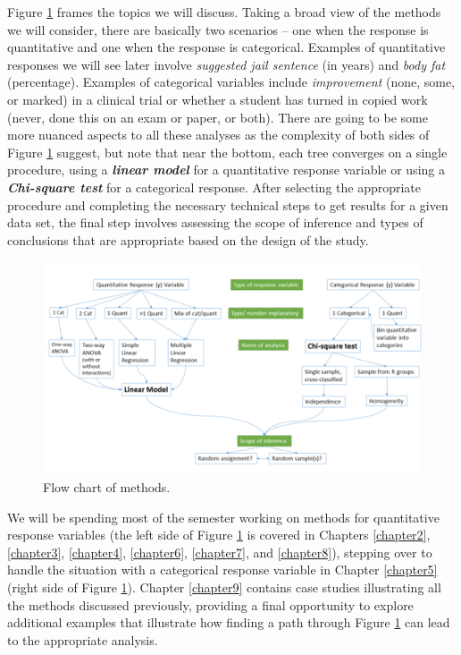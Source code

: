 \documentclass[]{book}
\renewcommand{\indent}{\hspace{15pt}}
\begin{document}
\indent Figure \ref{fig:Figure1-1} frames the topics we will discuss. Taking a broad
view of the methods we will consider,
there are basically two scenarios -- one when the response is quantitative and
one when the response is categorical. Examples of quantitative responses we will
see later involve \emph{suggested jail sentence} (in years) and \emph{body fat} (percentage).
Examples of categorical variables include \emph{improvement} (none, some, or marked)
in a clinical trial or whether a student has turned in copied work
(never, done this on an exam or paper, or both). There are going to be some more
nuanced aspects to all these analyses as the complexity of both sides of Figure
\ref{fig:Figure1-1} suggest, but note that near the bottom, each tree converges
on a single
procedure, using a \textbf{\emph{linear model}}  for a quantitative response variable or
using a \textbf{\emph{Chi-square test}} for a categorical response.  After selecting the
appropriate procedure and completing the necessary technical steps to get results
for a
given data set, the final step involves assessing the scope of inference
 and
types of conclusions that are appropriate based on the design of the study.



\begin{figure}[ht]
\includegraphics[width=18.36in]{chapter1_files/image002} \caption{Flow chart of methods.}\label{fig:Figure1-1}
\end{figure}

\indent We will be spending most of the semester working on methods for quantitative
response variables (the
left side of Figure \ref{fig:Figure1-1} is covered in Chapters \ref{chapter2},
\ref{chapter3}, \ref{chapter4}, \ref{chapter6}, \ref{chapter7}, and
\ref{chapter8}), stepping
over to handle the situation with a categorical response variable in Chapter \ref{chapter5} (right side
of Figure \ref{fig:Figure1-1}).
Chapter \ref{chapter9} contains case studies
illustrating all the methods discussed previously, providing a final opportunity
to explore additional examples that illustrate how finding a
path through Figure \ref{fig:Figure1-1} can lead to the appropriate analysis.
\end{document}
